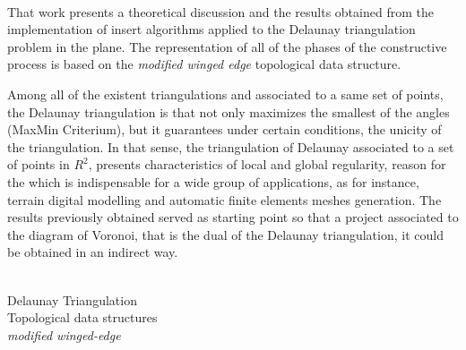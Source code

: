 
 \\ [6mm]

That work presents a theoretical discussion and the results obtained from the implementation of insert algorithms applied to the Delaunay triangulation problem in the plane. The representation of all of the phases of the constructive process is based on the \textit{modified winged edge} topological data structure.
 
Among all of the existent triangulations and associated to a same set of points, the Delaunay triangulation is that not only maximizes the smallest of the angles (MaxMin Criterium), but it guarantees under certain conditions, the unicity of the triangulation. In that sense, the triangulation of Delaunay associated to a set of points in $R^2$, presents characteristics of local and global regularity, reason for the which is indispensable for a wide group of applications, as for instance, terrain digital modelling and automatic finite elements meshes generation. The results previously obtained served as starting point so that a project associated to the diagram of Voronoi, that is the dual of the Delaunay triangulation, it could be obtained in an indirect way.


\vspace{15mm}

\\

\hspace{-7mm}
Delaunay Triangulation \\ [2mm]
Topological data structures \\ [2mm]
\textit{modified winged-edge} \\ [2mm]


 

